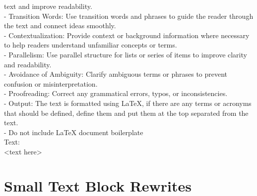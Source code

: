 text and improve readability. \\
- Transition Words: Use transition words and phrases to guide the reader through the text and connect ideas smoothly. \\
- Contextualization: Provide context or background information where necessary to help readers understand unfamiliar concepts or terms. \\
- Parallelism: Use parallel structure for lists or series of items to improve clarity and readability. \\
- Avoidance of Ambiguity: Clarify ambiguous terms or phrases to prevent confusion or misinterpretation. \\
- Proofreading: Correct any grammatical errors, typos, or inconsistencies. \\
- Output: The text is formatted using LaTeX, if there are any terms or acronyms that should be defined, define them and put them at the top separated from the text. \\
- Do not include LaTeX document boilerplate \\
Text: \\
<text here>

\section{Small Text Block Rewrites}
\footnotesize

